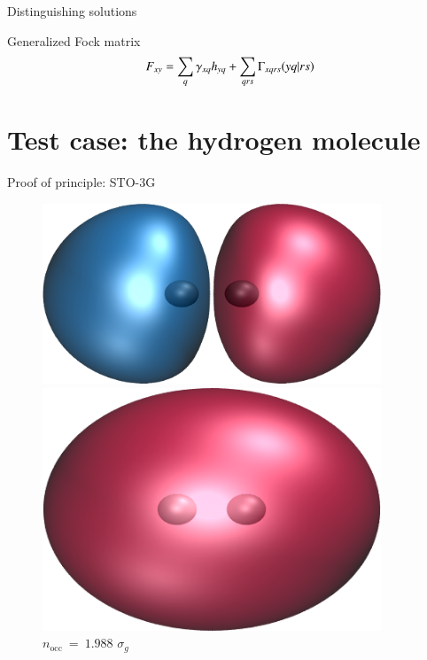 \documentclass[10pt]{beamer}
\begin{document}
\begin{frame}{Distinguishing solutions}
  \begin{block}{Generalized Fock matrix}
    \begin{equation}
      \label{eq:general_fock}
      F_{xy} = \sum_q \gamma_{xq}h_{yq} + \sum_{qrs} \Gamma_{xqrs}\ceri{yq}{rs}
    \end{equation}
  \end{block}
\end{frame}

\section{Test case: the hydrogen molecule}

\begin{frame}{Proof of principle:  STO-3G}

  \begin{figure}
    \centering

    \begin{columns}

      \begin{column}{0.15\textwidth}
        
        \includegraphics[width=0.9\textwidth]{Figures/H2_SA_mo1.cube.png}
        \caption*{\centering $n_\text{occ}~=~0.012$
        $\sigma_u$}
        \includegraphics[width=0.9\textwidth]{Figures/H2_SA_mo2.cube.png}
        \caption*{\centering $n_\text{occ}~=~1.988$
        $\sigma_g$}
      \end{column}


\end{columns}
\end{figure}
\end{frame}
\end{document}
